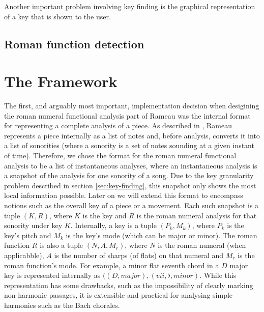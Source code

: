 
Another important problem involving key finding is the graphical
representation of a key that is shown to the user.

\subsection{Roman function detection}
\label{sec:roman-funct-detect}



\section{The Framework}
\label{sec:framework}


The first, and arguably most important, implementation decision when
desigining the roman numeral functional analysis part of Rameau was
the internal format for representing a complete analysis of a piece.
As described in \cite{kroger08:rameau}, Rameau represents a piece
internally as a list of notes and, before analysis, converts it into a
list of sonorities (where a sonority is a set of notes sounding at a
given instant of time). Therefore, we chose the format for the roman
numeral functional analysis to be a list of instantaneous analyses,
where an instantaneous analysis is a snapshot of the analysis for one
sonority of a song. Due to the key granularity problem described in
section \ref{sec:key-finding}, this snapshot only shows the most local
information possible. Later on we will extend this format to encompass
notions such as the overall key of a piece or a movement. Each such
snapshot is a tuple $(K,R)$, where $K$ is the key and $R$ is the roman
numeral analysis for that sonority under key $K$. Internally, a key is
a tuple $(P_k,M_k)$, where $P_k$ is the key's pitch and $M_k$ is the
key's mode (which can be major or minor).  The roman function $R$ is
also a tuple $(N,A,M_r)$, where $N$ is the roman numeral (when
applicabble), $A$ is the number of sharps (of flats) on that numeral
and $M_r$ is the roman function's mode. For example, a minor flat
seventh chord in a $D$ major key is represented internally as
$((D,major),(vii,\flat,minor)$. While this representation has some
drawbacks, such as the impossibility of clearly marking non-harmonic
passages, it is extensible and practical for analysing simple
harmonies such as the Bach chorales.

